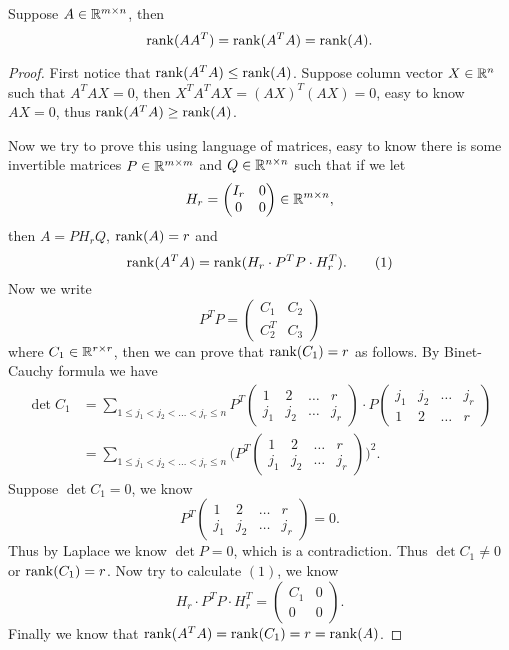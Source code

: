\begin{pro}%
	Suppose $A\in\mathbb{R}^{m\times n}$, then
	\[\operatorname*{rank}(AA^T)=\operatorname*{rank}(A^T A)=\operatorname*{rank}(A).\]
\end{pro}
\begin{proof}
	First notice that $\operatorname*{rank}(A^T A)\leq \operatorname*{rank}(A)$. Suppose column vector $X\in\mathbb{R}^n$ such that
	$A^T AX=0$, then $X^TA^TAX=(AX)^T(AX)=0$, easy to know $AX=0$, thus $\operatorname*{rank}(A^T A)\geq \operatorname*{rank}(A)$.

	Now we try to prove this using language of matrices, easy to know there is some invertible matrices 
	$P\in\mathbb{R}^{m\times m}$ and $Q\in\mathbb{R}^{n\times n}$ such that if we let 
	\[H_r=\begin{pmatrix}I_r & 0\\0 & 0\end{pmatrix}\in\mathbb{R}^{m\times n},\]
	then $A=PH_rQ$, $\operatorname*{rank}(A)=r$ and
	\[\operatorname*{rank}(A^T A)=\operatorname*{rank}(H_r\cdot P^T P\cdot H_r^T).\tag{1}\]
	Now we write
	\[P^TP=\begin{pmatrix} C_1 & C_2\\ C_2^T & C_3\end{pmatrix}\]
	where $C_1\in\mathbb{R}^{r\times r}$, then we can prove that $\operatorname*{rank}(C_1)=r$ as follows.
	By Binet-Cauchy formula we have
	\begin{align*}
	\det C_1&=\sum_{1\leq j_1<j_2<\dots <j_r\leq n} P^T\begin{pmatrix} 1 & 2 &\dots & r\\
	j_1 & j_2 &\dots &j_r\end{pmatrix}\cdot P\begin{pmatrix} j_1 & j_2 &\dots &j_r\\
	1 & 2 &\dots & r\end{pmatrix}\\
	&=\sum_{1\leq j_1<j_2<\dots <j_r\leq n} \bigg(P^T\begin{pmatrix} 1 & 2 &\dots & r\\
	j_1 & j_2 &\dots &j_r\end{pmatrix}\bigg)^2.
	\end{align*}
	Suppose $\det C_1=0$, we know
	\[P^T\begin{pmatrix} 1 & 2 &\dots & r\\j_1 & j_2 &\dots &j_r\end{pmatrix}=0.\]
	Thus by Laplace we know $\det P=0$, which is a contradiction. Thus $\det C_1\neq 0$ or $\operatorname*{rank}(C_1)=r$.
	Now try to calculate $(1)$, we know 
	\[H_r\cdot P^T P\cdot H_r^T=\begin{pmatrix} C_1 & 0\\ 0 & 0\end{pmatrix}.\]
	Finally we know that $\operatorname*{rank}(A^T A)=\operatorname*{rank}(C_1)=r=\operatorname*{rank}(A)$.
\end{proof}

